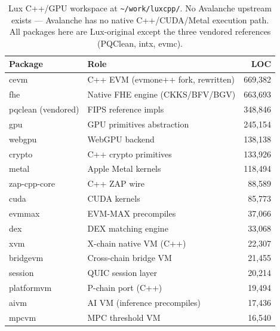 \documentclass[11pt,a4paper]{article}
\begin{document}
\begin{table}[h]
\centering
\small
\caption{Lux C++/GPU workspace at \texttt{\textasciitilde/work/luxcpp/}.
No Avalanche upstream exists --- Avalanche has no native C++/CUDA/Metal
execution path. All packages here are Lux-original except the three
vendored references (PQClean, intx, evmc).}
\label{tab:luxcpp-summary}
\begin{tabular}{l l r}
\toprule
\textbf{Package} & \textbf{Role} & \textbf{LOC} \\
\midrule
cevm                       & C++ EVM (evmone++ fork, rewritten)        & 669{,}382 \\
fhe                        & Native FHE engine (CKKS/BFV/BGV)          & 663{,}693 \\
pqclean (vendored)         & FIPS reference impls                      & 348{,}846 \\
gpu                        & GPU primitives abstraction                & 245{,}154 \\
webgpu                     & WebGPU backend                            & 138{,}138 \\
crypto                     & C++ crypto primitives                     & 133{,}926 \\
metal                      & Apple Metal kernels                       & 118{,}494 \\
zap-cpp-core               & C++ ZAP wire                              &  88{,}589 \\
cuda                       & CUDA kernels                              &  85{,}773 \\
evmmax                     & EVM-MAX precompiles                       &  37{,}066 \\
dex                        & DEX matching engine                       &  33{,}068 \\
xvm                        & X-chain native VM (C++)                   &  22{,}307 \\
bridgevm                   & Cross-chain bridge VM                     &  21{,}455 \\
session                    & QUIC session layer                        &  20{,}214 \\
platformvm                 & P-chain port (C++)                        &  19{,}494 \\
aivm                       & AI VM (inference precompiles)             &  17{,}436 \\
mpcvm                      & MPC threshold VM                          &  16{,}540 \\

\end{tabular}
\end{table}
\end{document}
